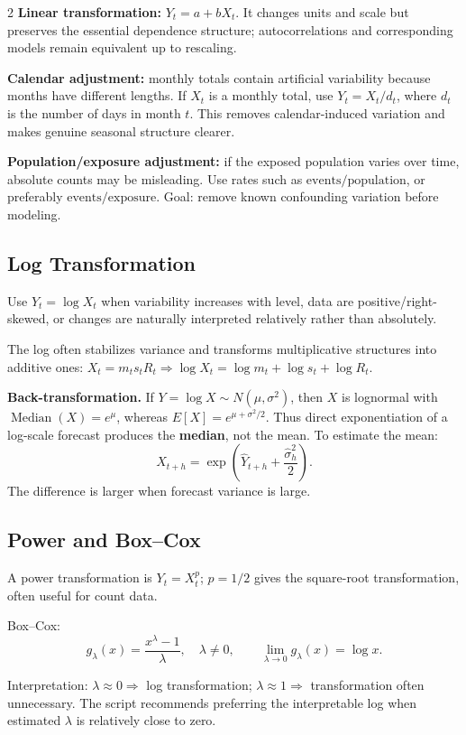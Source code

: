 \documentclass[9pt,a4paper]{extarticle}
\newcommand{\key}[1]{\textbf{#1}}
\begin{document}
\begin{multicols}{2}
\key{Linear transformation:} \(Y_t=a+bX_t\). It changes units and scale but preserves the essential dependence structure; autocorrelations and corresponding models remain equivalent up to rescaling.

\key{Calendar adjustment:} monthly totals contain artificial variability because months have different lengths. If \(X_t\) is a monthly total, use \(Y_t=X_t/d_t\), where \(d_t\) is the number of days in month \(t\). This removes calendar-induced variation and makes genuine seasonal structure clearer.

\key{Population/exposure adjustment:} if the exposed population varies over time, absolute counts may be misleading. Use rates such as \(\text{events}/\text{population}\), or preferably \(\text{events}/\text{exposure}\). Goal: remove known confounding variation before modeling.

\subsection{Log Transformation}

Use \(Y_t=\log X_t\) when variability increases with level, data are positive/right-skewed, or changes are naturally interpreted relatively rather than absolutely.

The log often stabilizes variance and transforms multiplicative structures into additive ones:
\(X_t=m_ts_tR_t \Rightarrow \log X_t=\log m_t+\log s_t+\log R_t\).

\key{Back-transformation.} If \(Y=\log X\sim N(\mu,\sigma^2)\), then \(X\) is lognormal with
\(\operatorname{Median}(X)=e^\mu\), whereas \(E[X]=e^{\mu+\sigma^2/2}\). Thus direct exponentiation of a log-scale forecast produces the \key{median}, not the mean. To estimate the mean:
\[
\boxed{\widehat X_{t+h}=\exp\!\left(\widehat Y_{t+h}+\frac{\widehat\sigma_h^2}{2}\right).}
\]
The difference is larger when forecast variance is large.

\subsection{Power and Box--Cox}

A power transformation is \(Y_t=X_t^p\); \(p=1/2\) gives the square-root transformation, often useful for count data.

Box--Cox:
\[
g_\lambda(x)=\frac{x^\lambda-1}{\lambda},\quad \lambda\neq0,
\qquad \lim_{\lambda\to0}g_\lambda(x)=\log x.
\]

Interpretation: \(\lambda\approx0\Rightarrow\) log transformation; \(\lambda\approx1\Rightarrow\) transformation often unnecessary. The script recommends preferring the interpretable log when estimated \(\lambda\) is relatively close to zero.


\end{multicols}
\end{document}
